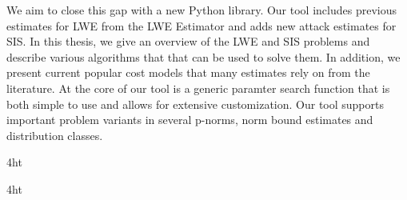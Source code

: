 \documentclass[
  a4paper,  %
  twoside,  %
  bibliography=totoc,
  headsepline,
  cleardoublepage=empty,
  parskip=half,
  draft=false
]{scrbook}
\begin{document}
We aim to close this gap with a new Python library. Our tool includes previous estimates for LWE from the LWE Estimator and adds new attack estimates for SIS. In this thesis, we give an overview of the LWE and SIS problems and describe various algorithms that that can be used to solve them. In addition, we present current popular cost models that many estimates rely on from the literature. At the core of our tool is a generic paramter search function that is both simple to use and allows for extensive customization. Our tool supports important problem variants in several p-norms, norm bound estimates and distribution classes.

\cleardoublepage



\iftex4ht
\else
\fi

%
%

%
%
%
\tableofcontents


\listoffigures
\listoftables

\ifdeutsch
\else
\fi

\listofalgorithms %

\printnoidxglossaries

\iftex4ht
\else
\fi
\end{document}
